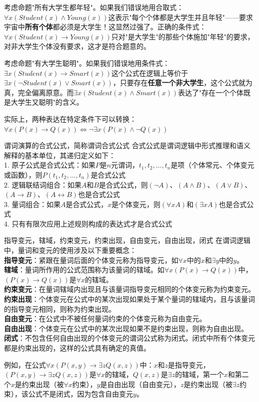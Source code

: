 \documentclass[lang=cn,11pt]{elegantbook}
\begin{document}
考虑命题"所有大学生都年轻"。如果我们错误地用合取式：$\forall x (Student(x) \land Young(x))$这表示"每个个体都是大学生并且年轻"——要求宇宙中\textbf{所有个体}都必须是大学生！这显然过强了。正确的条件式：$\forall x (Student(x) \rightarrow Young(x))$只对"是大学生"的那些个体施加"年轻"的要求，对非大学生个体没有要求，这才是符合题意的。

考虑命题"有大学生聪明"。如果我们错误地用条件式：$\exists x (Student(x) \rightarrow Smart(x))$这个公式在逻辑上等价于$\exists x (\neg Student(x) \lor Smart(x))$，只要存在\textbf{任意一个非大学生}，这个公式就为真，完全偏离原意。而$\exists x (Student(x) \land Smart(x))$表达了"存在一个个体既是大学生又聪明"的含义。

实际上，两种表达在特定条件下可以转换：$\forall x (P(x) \rightarrow Q(x)) \Leftrightarrow \neg \exists x (P(x) \land \neg Q(x))$
\begin{definition}{谓词演算的合式公式，简称谓词合式公式}
合式公式是谓词逻辑中形式推理和语义解释的基本单位，其递归定义如下：\\
1. 原子公式是合式公式：如果$P$是$n$元谓词，$t_1, t_2, \ldots, t_n$是项（个体常元、个体变元或函数），则$P(t_1, t_2, \ldots, t_n)$是合式公式\\
2. 逻辑联结词组合：如果$A$和$B$是合式公式，则$(\neg A)$、$(A \land B)$、$(A \lor B)$、$(A \rightarrow B)$、$(A \leftrightarrow B)$也是合式公式\\
3. 量词组合：如果$A$是合式公式，$x$是个体变元，则$(\forall x A)$和$(\exists x A)$也是合式公式\\
4. 只有有限次应用上述规则构成的表达式才是合式公式
\end{definition}
\begin{definition}{指导变元，辖域，约束变元，约束出现，自由变元，自由出现，闭式}
在谓词逻辑中，量词和变元的使用涉及以下重要概念：\\
\textbf{指导变元}：紧跟在量词后面的个体变元称为指导变元，如$\forall x$中的$x$和$\exists y$中的$y$。\\
\textbf{辖域}：量词所作用的公式范围称为该量词的辖域。如$\forall x (P(x) \rightarrow Q(x))$中，$(P(x) \rightarrow Q(x))$是$\forall x$的辖域。\\
\textbf{约束变元}：在量词辖域内出现且与该量词指导变元相同的个体变元称为约束变元。\\
\textbf{约束出现}：个体变元在公式中的某次出现如果处于某个量词的辖域内，且与该量词的指导变元相同，则称为约束出现。\\
\textbf{自由变元}：在公式中不被任何量词约束的个体变元称为自由变元。\\
\textbf{自由出现}：个体变元在公式中的某次出现如果不是约束出现，则称为自由出现。\\
\textbf{闭式}：不包含任何自由出现的个体变元的谓词公式称为闭式。闭式中所有个体变元都是约束出现的，这样的公式具有确定的真值。
\end{definition}
例如，在公式$\forall x (P(x,y) \rightarrow \exists z Q(x,z))$中：$x$和$z$是指导变元，$(P(x,y) \rightarrow \exists z Q(x,z))$是$\forall x$的辖域，$Q(x,z)$是$\exists z$的辖域，第一个$x$和第二个$x$是约束出现（被$\forall x$约束），$y$是自由出现（自由变元），$z$是约束出现（被$\exists z$约束），该公式不是闭式，因为包含自由变元$y$。
\end{document}
